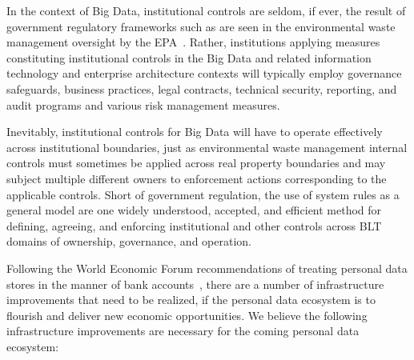 In the context of Big Data, institutional controls are seldom, if ever, the result of government regulatory frameworks such as are seen in the environmental waste management oversight by the EPA~\cite{DeMeo2011,FloridaEPA2012,UFlorida2005}.
Rather, institutions applying measures constituting institutional controls in the Big Data and related information technology and enterprise architecture contexts will typically employ governance safeguards, business practices, legal contracts, technical security, reporting, and audit programs and various risk management measures.

Inevitably, institutional controls for Big Data will have to operate effectively across institutional boundaries, just as environmental waste management internal controls must sometimes be applied across real property boundaries and may subject multiple different owners to enforcement actions corresponding to the applicable controls.
Short of government regulation, the use of system rules as a general model are one widely understood, accepted, and efficient method for defining, agreeing, and enforcing institutional and other controls across BLT domains of ownership, governance, and operation.

Following the World Economic Forum recommendations of treating personal data stores in the manner
of bank accounts~\cite{WEF2011}, there are a number of infrastructure improvements that need
to be realized, if the personal data ecosystem is to flourish and deliver new economic opportunities.
We believe the following infrastructure improvements are necessary for the coming personal data ecosystem:

